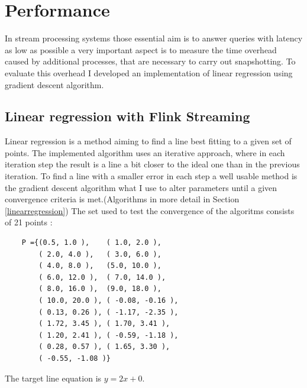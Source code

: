 \cite{abs}

\section{Performance}
In stream processing systems those essential aim is to answer queries with latency as low as possible a very important aspect is to measure the time overhead caused by  additional processes, that are necessary to carry out snapshotting. To evaluate this overhead I developed an implementation of linear regression using gradient descent
algorithm.
\subsection{Linear regression with Flink Streaming}
Linear regression is a method aiming to find a line best fitting to a given set of points. The implemented algorithm uses an iterative approach, where in each iteration step the result is a line a bit closer to the ideal one than in the previous iteration. To find a line with a smaller error in each step a well usable method is the gradient descent algorithm what I use to alter parameters until a given convergence criteria is met.(Algorithms in more detail in Section \ref{linearregression})
The set used to test the convergence of the algoritms consists of 21 points :
\begin{lstlisting}
 	P ={(0.5, 1.0 ),	( 1.0, 2.0 ),
		( 2.0, 4.0 ),	( 3.0, 6.0 ),
		( 4.0, 8.0 ),	(5.0, 10.0 ),
		( 6.0, 12.0 ),	( 7.0, 14.0 ),
		( 8.0, 16.0 ),	(9.0, 18.0 ),
		( 10.0, 20.0 ),	( -0.08, -0.16 ),
		( 0.13, 0.26 ),	( -1.17, -2.35 ),
		( 1.72, 3.45 ),	( 1.70, 3.41 ),
		( 1.20, 2.41 ),	( -0.59, -1.18 ),
		( 0.28, 0.57 ),	( 1.65, 3.30 ),
		( -0.55, -1.08 )}
\end{lstlisting}
The target line equation is $y=2x+0$.

